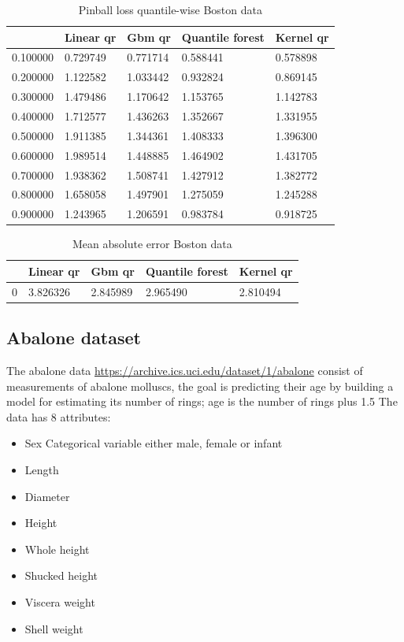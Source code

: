 \begin{table}
    \caption{Pinball loss quantile-wise Boston data}
\begin{tabular}{lllll}
\toprule
    & Linear qr & Gbm qr & Quantile forest & Kernel qr \\
\midrule
0.100000 & 0.729749 & 0.771714 & 0.588441 & 0.578898 \\
0.200000 & 1.122582 & 1.033442 & 0.932824 & 0.869145 \\
0.300000 & 1.479486 & 1.170642 & 1.153765 & 1.142783 \\
0.400000 & 1.712577 & 1.436263 & 1.352667 & 1.331955 \\
0.500000 & 1.911385 & 1.344361 & 1.408333 & 1.396300 \\
0.600000 & 1.989514 & 1.448885 & 1.464902 & 1.431705 \\
0.700000 & 1.938362 & 1.508741 & 1.427912 & 1.382772 \\
0.800000 & 1.658058 & 1.497901 & 1.275059 & 1.245288 \\
0.900000 & 1.243965 & 1.206591 & 0.983784 & 0.918725 \\
\bottomrule
\end{tabular}
\end{table}
        
\begin{table}
\caption{Mean absolute error Boston data}    
\begin{tabular}{lllll}
\toprule
    & Linear qr & Gbm qr & Quantile forest & Kernel qr \\
\midrule
0 & 3.826326 & 2.845989 & 2.965490 & 2.810494 \\
\bottomrule
\end{tabular}

\end{table}

\subsection{Abalone dataset}
The abalone data \href{https://archive.ics.uci.edu/dataset/1/abalone}{https://archive.ics.uci.edu/dataset/1/abalone} consist of measurements of abalone molluscs, the goal is predicting their age by building a model for estimating its number of rings; age is the number of rings plus 1.5
The data has 8 attributes:
\begin{itemize}
    \item Sex Categorical variable either male, female or infant
    \item Length
    \item Diameter
    \item Height
    \item Whole height
    \item Shucked height
    \item Viscera weight
    \item Shell weight
\end{itemize}

